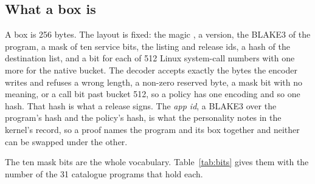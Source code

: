\subsection{What a box is}

A box is 256 bytes. The layout is fixed: the magic , a version, the BLAKE3 of the program, a mask of ten service bits, the listing and release ids, a hash of the destination list, and a bit for each of 512 Linux system-call numbers with one more for the native bucket. The decoder accepts exactly the bytes the encoder writes and refuses a wrong length, a non-zero reserved byte, a mask bit with no meaning, or a call bit past bucket 512, so a policy has one encoding and so one hash. That hash is what a release signs. The \emph{app id}, a BLAKE3 over the program's hash and the policy's hash, is what the personality notes in the kernel's record, so a proof names the program and its box together and neither can be swapped under the other.

The ten mask bits are the whole vocabulary. Table~\ref{tab:bits} gives them with the number of the 31 catalogue programs that hold each.

\begin{table}[t]
\centering
\caption{The words a box is written in, and how many of the \nPrograms{} Marketplace programs hold each. Three further words exist in the code:  (the person's own files),  (reading the local models) and  (one listener at a port a policy names); the catalogue generator refuses a recipe that asks for , so no listed program has it. Counted from ; definitions in .}
\label{tab:bits}

\end{table}

